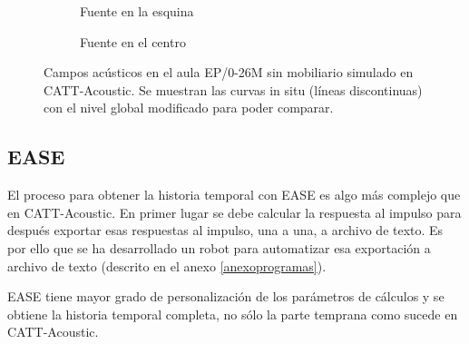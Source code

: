 \begin{figure}[H]
    \begin{subfigure}[b]{0.4\textwidth}
    	\centering%
         {%
    }
    \caption{Fuente en la esquina}%
    \label{graf:cattepsnomob-a}
    \end{subfigure}%
    \hspace{1.9cm}%
    \begin{subfigure}[b]{0.4\textwidth}%
    	\centering%
        {%
    }
    \caption{Fuente en el centro}%
    \end{subfigure}
    \caption{Campos acústicos en el aula EP/0-26M sin mobiliario simulado en CATT-Acoustic. Se muestran las curvas in situ (líneas discontinuas) con el nivel global modificado para poder comparar.}
    \label{graf:cattepsnomob}%
\end{figure}




\subsection{EASE}

El proceso para obtener la historia temporal con EASE es algo más complejo que en CATT-Acoustic. En primer lugar se debe calcular la respuesta al impulso para después exportar esas respuestas al impulso, una a una, a archivo de texto. Es por ello que se ha desarrollado un robot para automatizar esa exportación a archivo de texto (descrito en el anexo \ref{anexoprogramas}).

EASE tiene mayor grado de personalización de los parámetros de cálculos y se obtiene la historia temporal completa, no sólo la parte temprana como sucede en CATT-Acoustic.

